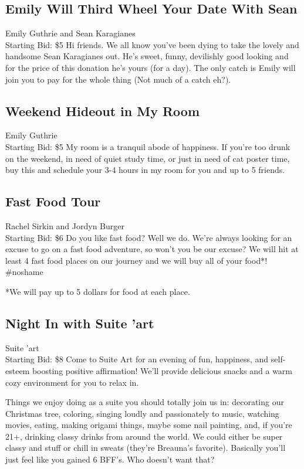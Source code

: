 \documentclass[11pt]{article}
\begin{document}
\subsection{Emily Will Third Wheel Your Date With Sean}
Emily Guthrie and Sean Karagianes
\\
Starting Bid: \$5
\newline
Hi friends. We all know you've been dying to take the lovely and handsome Sean Karagianes out. He's sweet, funny, devilishly good looking and for the price of this donation he's yours (for a day). The only catch is Emily will join you to pay for the whole thing (Not much of a catch eh?).
\subsection{Weekend Hideout in My Room}
Emily Guthrie
\\
Starting Bid: \$5
\newline
My room is a tranquil abode of happiness. If you're too drunk on the weekend, in need of quiet study time, or just in need of cat poster time, buy this and schedule your 3-4 hours in my room for you and up to 5 friends.
\subsection{Fast Food Tour}
Rachel Sirkin and Jordyn Burger
\\
Starting Bid: \$6
\newline
Do you like fast food? Well we do. We're always looking for an excuse to go on a fast food adventure, so won't you be our excuse? We will hit at least 4 fast food places on our journey and we will buy all of your food*! \#noshame

*We will pay up to 5 dollars for food at each place.
\subsection{Night In with Suite 'art}
Suite 'art
\\
Starting Bid: \$8
\newline
Come to Suite Art for an evening of fun, happiness, and self-esteem boosting positive affirmation! We'll provide delicious snacks and a warm cozy environment for you to relax in. 

Things we enjoy doing as a suite you should totally join us in: decorating our Christmas tree, coloring, singing loudly and passionately to music, watching movies, eating, making origami things, maybe some nail painting, and, if you're 21+, drinking classy drinks from around the world. We could either be super classy and stuff or chill in sweats (they're Breauna's favorite). Basically you'll just feel like you gained 6 BFF's. Who doesn't want that?
\end{document}
